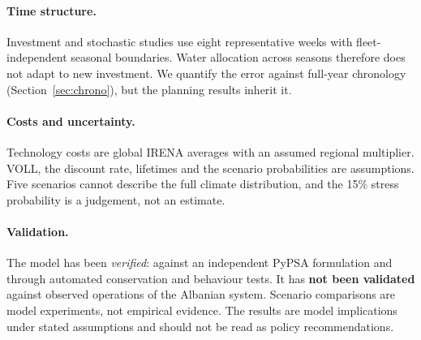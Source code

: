 \paragraph{Time structure.} Investment and stochastic studies use eight representative weeks with
fleet-independent seasonal boundaries. Water allocation across seasons therefore does not adapt to new
investment. We quantify the error against full-year chronology (Section~\ref{sec:chrono}), but the planning
results inherit it.

\paragraph{Costs and uncertainty.} Technology costs are global IRENA averages with an assumed regional
multiplier. VOLL, the discount rate, lifetimes and the scenario probabilities are assumptions. Five scenarios
cannot describe the full climate distribution, and the 15\% stress probability is a judgement, not an estimate.

\paragraph{Validation.} The model has been \emph{verified}: against an independent PyPSA formulation and through
automated conservation and behaviour tests. It has \textbf{not been validated} against observed operations of
the Albanian system. Scenario comparisons are model experiments, not empirical evidence. The results are model
implications under stated assumptions and should not be read as policy recommendations.
